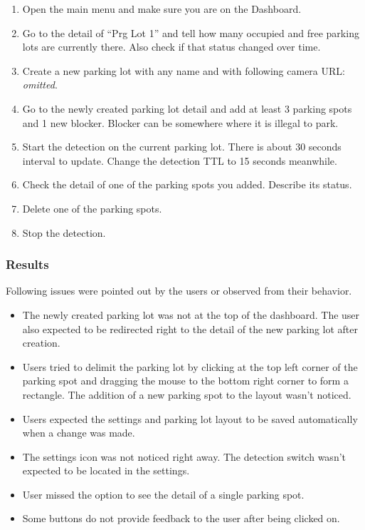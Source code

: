 \documentclass[thesis=M,english]{FITthesis}[2019/03/06]
\begin{document}
\begin{enumerate}
    \item Open the main menu and make sure you are on the Dashboard.
    \item Go to the detail of \enquote{Prg Lot 1} and tell how many occupied and free parking lots are currently there. Also check if that status changed over time.
    \item Create a new parking lot with any name and with following camera URL: \textit{omitted}.
    \item Go to the newly created parking lot detail and add at least 3 parking spots and 1 new blocker. Blocker can be somewhere where it is illegal to park.
    \item Start the detection on the current parking lot. There is about 30 seconds interval to update. Change the detection TTL to 15 seconds meanwhile.
    \item Check the detail of one of the parking spots you added. Describe its status.
    \item Delete one of the parking spots.
    \item Stop the detection.
\end{enumerate}


\subsubsection{Results}
Following issues were pointed out by the users or observed from their behavior.

\begin{itemize}
    \item The newly created parking lot was not at the top of the dashboard. The user also expected to be redirected right to the detail of the new parking lot after creation.
    \item Users tried to delimit the parking lot by clicking at the top left corner of the parking spot and dragging the mouse to the bottom right corner to form a rectangle. The addition of a new parking spot to the layout wasn't noticed.
    \item Users expected the settings and parking lot layout to be saved automatically when a change was made.
    \item The settings icon was not noticed right away. The detection switch wasn't expected to be located in the settings.
    \item User missed the option to see the detail of a single parking spot.
    \item Some buttons do not provide feedback to the user after being clicked on.
\end{itemize}
\end{document}
